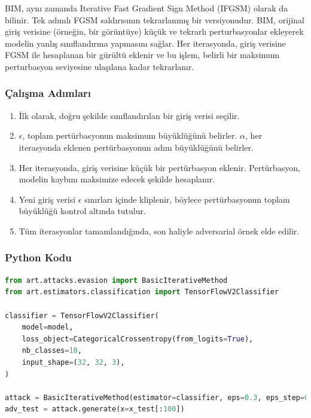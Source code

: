 BIM, aynı zamanda Iterative Fast Gradient Sign Method (IFGSM) olarak da bilinir. Tek adımlı FGSM saldırısının tekrarlanmış bir versiyonudur. BIM, orijinal giriş verisine (örneğin, bir görüntüye) küçük ve tekrarlı perturbasyonlar ekleyerek modelin yanlış sınıflandırma yapmasını sağlar. Her iterasyonda, giriş verisine FGSM ile hesaplanan bir gürültü eklenir ve bu işlem, belirli bir maksimum perturbasyon seviyesine ulaşılana kadar tekrarlanır.

\subsubsection{Çalışma Adımları}

\begin{enumerate}
    \item İlk olarak, doğru şekilde sınıflandırılan bir giriş verisi seçilir.
    \item $\epsilon$, toplam pertürbasyonun maksimum büyüklüğünü belirler. $\alpha$, her iterasyonda eklenen pertürbasyonun adım büyüklüğünü belirler.
    \item Her iterasyonda, giriş verisine küçük bir pertürbasyon eklenir. Pertürbasyon, modelin kaybını maksimize edecek şekilde hesaplanır.
    \item Yeni giriş verisi $\epsilon$ sınırları içinde kliplenir, böylece pertürbasyonun toplam büyüklüğü kontrol altında tutulur.
    \item Tüm iterasyonlar tamamlandığında, son haliyle adversarial örnek elde edilir.
\end{enumerate}

\subsubsection{Python Kodu}

\begin{lstlisting}[language=Python]
from art.attacks.evasion import BasicIterativeMethod
from art.estimators.classification import TensorFlowV2Classifier

classifier = TensorFlowV2Classifier(
    model=model,
    loss_object=CategoricalCrossentropy(from_logits=True),
    nb_classes=10,
    input_shape=(32, 32, 3),
)

attack = BasicIterativeMethod(estimator=classifier, eps=0.3, eps_step=0.01, max_iter=10)
adv_test = attack.generate(x=x_test[:100])
\end{lstlisting}

\newpage

